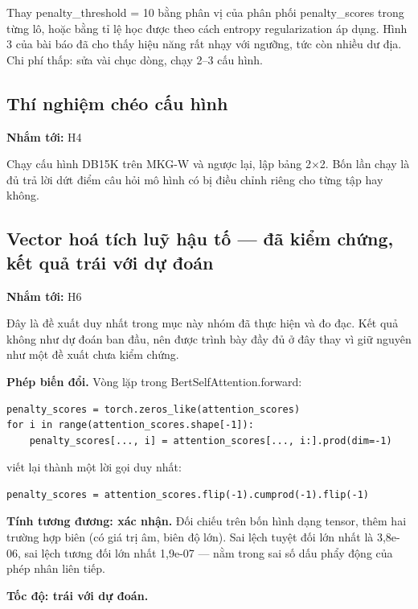 \documentclass[11pt,a4paper]{article}
\newcommand{\code}[1]{{\ttfamily\small\color{codetext}#1}}
\begin{document}
Thay \code{penalty\_threshold = 10} bằng phân vị của phân phối \code{penalty\_scores} trong từng lô, hoặc bằng tỉ lệ học được theo cách entropy regularization áp dụng. Hình 3 của bài báo đã cho thấy hiệu năng rất nhạy với ngưỡng, tức còn nhiều dư địa. Chi phí thấp: sửa vài chục dòng, chạy 2--3 cấu hình.

\subsection{Thí nghiệm chéo cấu hình}
\textbf{Nhắm tới:} H4

Chạy cấu hình DB15K trên MKG-W và ngược lại, lập bảng 2$\times$2. Bốn lần chạy là đủ trả lời dứt điểm câu hỏi mô hình có bị điều chỉnh riêng cho từng tập hay không.

\subsection{Vector hoá tích luỹ hậu tố --- đã kiểm chứng, kết quả trái với dự đoán}
\textbf{Nhắm tới:} H6

Đây là đề xuất duy nhất trong mục này nhóm đã thực hiện và đo đạc. Kết quả không như dự đoán ban đầu, nên được trình bày đầy đủ ở đây thay vì giữ nguyên như một đề xuất chưa kiểm chứng.

\textbf{Phép biến đổi.} Vòng lặp trong \code{BertSelfAttention.forward}:

\begin{lstlisting}
penalty_scores = torch.zeros_like(attention_scores)
for i in range(attention_scores.shape[-1]):
    penalty_scores[..., i] = attention_scores[..., i:].prod(dim=-1)
\end{lstlisting}
viết lại thành một lời gọi duy nhất:

\begin{lstlisting}
penalty_scores = attention_scores.flip(-1).cumprod(-1).flip(-1)
\end{lstlisting}
\textbf{Tính tương đương: xác nhận.} Đối chiếu trên bốn hình dạng tensor, thêm hai trường hợp biên (có giá trị âm, biên độ lớn). Sai lệch tuyệt đối lớn nhất là 3,8e-06, sai lệch tương đối lớn nhất 1,9e-07 --- nằm trong sai số dấu phẩy động của phép nhân liên tiếp.

\textbf{Tốc độ: trái với dự đoán.}
\end{document}
